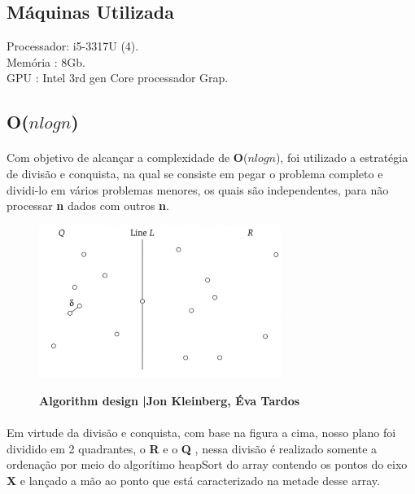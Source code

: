 \documentclass[12pt]{article}
\begin{document}
\subsection{Máquinas Utilizada}

Processador: i5-3317U (4). \\
Memória : 8Gb.\\
GPU : Intel 3rd gen Core processador Grap.

\subsection{\textbf{O}($nlogn$)}


\paragraph{}Com objetivo de alcançar a complexidade de \textbf{O}($nlogn$), foi utilizado a estratégia de divisão e conquista, na qual se consiste em pegar o problema completo e dividi-lo em vários problemas menores, os quais são independentes, para não processar \textbf{n} dados com outros \textbf{n}.

\begin{center}
    \begin{figure}[h!]
        \centering
        \includegraphics[width=0.7\textwidth]{imagens/1Imagem.png}
        
        
        \textbf{Algorithm design |Jon Kleinberg, Éva Tardos} 
    \end{figure}
\end{center}

\paragraph{}  Em virtude da divisão e conquista, com base na figura a cima, nosso plano foi dividido em 2 quadrantes, o \textbf{R} e o \textbf{Q} , nessa divisão é realizado somente a ordenação por meio do algorítimo heapSort do array contendo os pontos do eixo \textbf{X} e lançado a mão ao ponto que está caracterizado na metade desse array.
\end{document}
